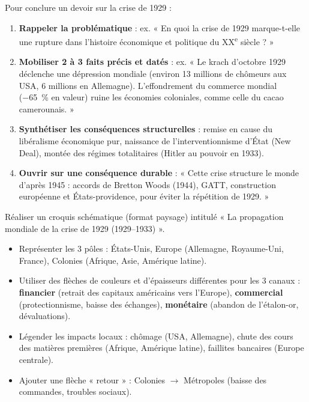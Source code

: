 \documentclass[11pt]{article}
\begin{document}
\begin{methode}
Pour conclure un devoir sur la crise de 1929 :
\begin{enumerate}
    \item \textbf{Rappeler la problématique} : ex. « En quoi la crise de 1929 marque-t-elle une rupture dans l'histoire économique et politique du XX\textsuperscript{e} siècle ? »
    \item \textbf{Mobiliser 2 à 3 faits précis et datés} : ex. « Le krach d'octobre 1929 déclenche une dépression mondiale (environ \num{13} millions de chômeurs aux USA, \num{6} millions en Allemagne). L'effondrement du commerce mondial (\SI{-65}{\%} en valeur) ruine les économies coloniales, comme celle du cacao camerounais. »
    \item \textbf{Synthétiser les conséquences structurelles} : remise en cause du libéralisme économique pur, naissance de l'interventionnisme d'État (New Deal), montée des régimes totalitaires (Hitler au pouvoir en 1933).
    \item \textbf{Ouvrir sur une conséquence durable} : « Cette crise structure le monde d'après 1945 : accords de Bretton Woods (1944), GATT, construction européenne et États-providence, pour éviter la répétition de 1929. »
\end{enumerate}
\end{methode}

\begin{exercice}
Réaliser un croquis schématique (format paysage) intitulé « La propagation mondiale de la crise de 1929 (1929--1933) ».
\begin{itemize}
    \item Représenter les 3 pôles : États-Unis, Europe (Allemagne, Royaume-Uni, France), Colonies (Afrique, Asie, Amérique latine).
    \item Utiliser des flèches de couleurs et d'épaisseurs différentes pour les 3 canaux : \textbf{financier} (retrait des capitaux américains vers l'Europe), \textbf{commercial} (protectionnisme, baisse des échanges), \textbf{monétaire} (abandon de l'étalon-or, dévaluations).
    \item Légender les impacts locaux : chômage (USA, Allemagne), chute des cours des matières premières (Afrique, Amérique latine), faillites bancaires (Europe centrale).
    \item Ajouter une flèche « retour » : Colonies $\to$ Métropoles (baisse des commandes, troubles sociaux).
\end{itemize}
\end{exercice}
\end{document}
